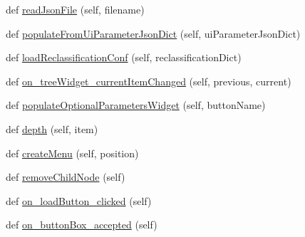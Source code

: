 \begin{DoxyCompactItemize}
\item 
def \mbox{\hyperlink{class_dsg_tools_1_1_production_tools_1_1_field_tool_box_1_1field__setup_1_1_field_setup_aac4a1f946a786021c21263aaf7d7466e}{read\+Json\+File}} (self, filename)
\item 
def \mbox{\hyperlink{class_dsg_tools_1_1_production_tools_1_1_field_tool_box_1_1field__setup_1_1_field_setup_a57af62e03b1d40b564674204a34285d7}{populate\+From\+Ui\+Parameter\+Json\+Dict}} (self, ui\+Parameter\+Json\+Dict)
\item 
def \mbox{\hyperlink{class_dsg_tools_1_1_production_tools_1_1_field_tool_box_1_1field__setup_1_1_field_setup_aca5f44dea463a3d6404805334368dbb9}{load\+Reclassification\+Conf}} (self, reclassification\+Dict)
\item 
def \mbox{\hyperlink{class_dsg_tools_1_1_production_tools_1_1_field_tool_box_1_1field__setup_1_1_field_setup_a102c7b87541e966cd5042cd505fa4f1e}{on\+\_\+tree\+Widget\+\_\+current\+Item\+Changed}} (self, previous, current)
\item 
def \mbox{\hyperlink{class_dsg_tools_1_1_production_tools_1_1_field_tool_box_1_1field__setup_1_1_field_setup_a984912158747ae34893247521efdbbe1}{populate\+Optional\+Parameters\+Widget}} (self, button\+Name)
\item 
def \mbox{\hyperlink{class_dsg_tools_1_1_production_tools_1_1_field_tool_box_1_1field__setup_1_1_field_setup_aee4760d72fd7cb7642f05ca025a54336}{depth}} (self, item)
\item 
def \mbox{\hyperlink{class_dsg_tools_1_1_production_tools_1_1_field_tool_box_1_1field__setup_1_1_field_setup_aa31edcd4f7d88997322483f4a9e53e5a}{create\+Menu}} (self, position)
\item 
def \mbox{\hyperlink{class_dsg_tools_1_1_production_tools_1_1_field_tool_box_1_1field__setup_1_1_field_setup_ab4cb7ebc5baf632cc4c4eb5b4c6e2b54}{remove\+Child\+Node}} (self)
\item 
def \mbox{\hyperlink{class_dsg_tools_1_1_production_tools_1_1_field_tool_box_1_1field__setup_1_1_field_setup_a35b475cfbf137a6517295b106789794f}{on\+\_\+load\+Button\+\_\+clicked}} (self)
\item 
def \mbox{\hyperlink{class_dsg_tools_1_1_production_tools_1_1_field_tool_box_1_1field__setup_1_1_field_setup_a38663e31c6b8f356361f104d8819d755}{on\+\_\+button\+Box\+\_\+accepted}} (self)
\end{DoxyCompactItemize}
